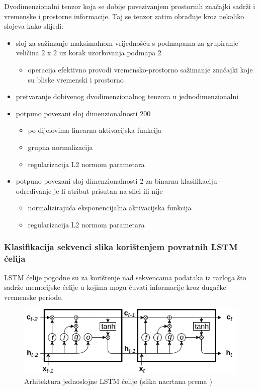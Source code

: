 \documentclass[times, utf8, diplomski, numeric]{fer}
\begin{document}
Dvodimenzionalni tenzor koja se dobije povezivanjem prostornih značajki sadrži i vremenske i prostorne informacije. 
Taj se tenzor zatim obrađuje kroz nekoliko slojeva kako slijedi:
\begin{itemize}
 \item sloj za sažimanje maksimalnom vrijednošću s podmapama za grupiranje veličina $2$ x $2$ uz korak uzorkovanja podmapa 2
 \begin{itemize}
  \item operacija efektivno provodi vremensko-prostorno sažimanje značajki koje su bliske vremenski i prostorno
 \end{itemize}
 \item pretvaranje dobivenog dvodimenzionalnog tenzora u jednodimenzionalni
 \item potpuno povezani sloj dimenzionalnosti 200
 \begin{itemize}
  \item po dijelovima linearna  aktivacijska funkcija
  \item grupna normalizacija 
  \item regularizacija L2 normom parametara
 \end{itemize}
 \item potpuno povezani sloj dimenzionalnosti 2 za binarnu klasifikaciju -- određivanje je li atribut prisutan na slici ili nije
 \begin{itemize}
  \item normalizirajuća eksponencijalna  aktivacijska funkcija
  \item regularizacija L2 normom parametara
 \end{itemize}
\end{itemize}

\subsubsection{Klasifikacija sekvenci slika korištenjem povratnih LSTM ćelija }
LSTM ćelije pogodne su za korištenje nad sekvencama podataka iz razloga što sadrže memorijske ćelije u kojima mogu čuvati informacije kroz dugačke vremenske periode.

\begin{figure}[H]
\centering
\includegraphics[scale=0.7]{images/lstm_input.png}
\caption{Arhitektura jednoslojne LSTM ćelije (slika nacrtana prema \citep{article:lstm})}
\label{img:lstm_input}
\end{figure}
\end{document}
